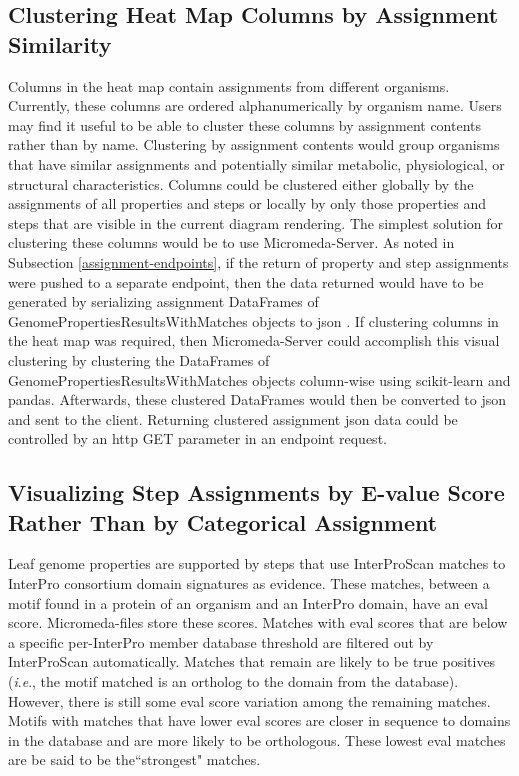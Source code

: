 \subsection{Clustering Heat Map Columns by Assignment Similarity}

Columns in the heat map contain assignments from different organisms. Currently, 
these columns are ordered alphanumerically by organism name. Users may find it 
useful to be able to cluster these columns by assignment contents rather than by 
name. Clustering by assignment contents would group organisms that have similar 
assignments and potentially similar metabolic, physiological, or structural 
characteristics. Columns could be clustered either globally by the assignments 
of all properties and steps or locally by only those properties and steps that 
are visible in the current diagram rendering. The simplest solution for 
clustering these columns would be to use Micromeda-Server. As noted in 
Subsection \ref{assignment-endpoints}, if the return of property and step 
assignments were pushed to a separate endpoint, then the data returned would 
have to be generated by serializing assignment DataFrames of 
GenomePropertiesResultsWithMatches objects to \gls{json} \cite{bray2014rfc}. If 
clustering columns in the heat map was required, then Micromeda-Server could 
accomplish this visual clustering by clustering the DataFrames of 
GenomePropertiesResultsWithMatches objects column-wise using \gls{scikit}-learn 
\cite{pedregosa2011scikit} and pandas. Afterwards, these clustered DataFrames 
would then be converted to \gls{json} and sent to the client. Returning 
clustered assignment \gls{json} data could be controlled by an \gls{http} GET 
parameter in an endpoint request. 

\subsection{Visualizing Step Assignments by E-value Score Rather Than by 
Categorical Assignment} \label{interface-e-value}

Leaf genome properties are supported by steps that use InterProScan matches to 
InterPro consortium domain signatures as evidence. These matches, between a 
motif found in a protein of an organism and an InterPro domain, have an 
\gls{eval} score. Micromeda-files store these scores. Matches with \gls{eval} 
scores that are below a specific per-InterPro member database threshold are 
filtered out by InterProScan automatically. Matches that remain are likely to be 
true positives (\textit{i}.\textit{e}., the motif matched is an ortholog to the domain from the 
database). However, there is still some \gls{eval} score variation among the 
remaining matches. Motifs with matches that have lower \gls{eval} scores are 
closer in sequence to domains in the database and are more likely to be 
orthologous. These lowest \gls{eval} matches are be said to be the``strongest" 
matches.

